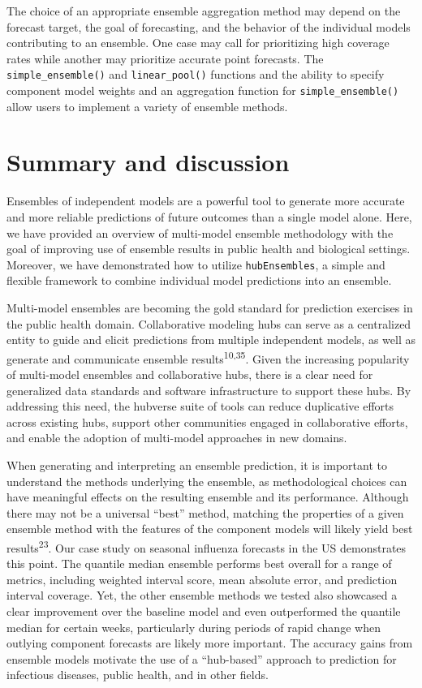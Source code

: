 \documentclass[
  letterpaper,
  DIV=11,
  numbers=noendperiod]{scrartcl}
\begin{document}
The choice of an appropriate ensemble aggregation method may depend on
the forecast target, the goal of forecasting, and the behavior of the
individual models contributing to an ensemble. One case may call for
prioritizing high coverage rates while another may prioritize accurate
point forecasts. The \texttt{simple\_ensemble()} and
\texttt{linear\_pool()} functions and the ability to specify component
model weights and an aggregation function for
\texttt{simple\_ensemble()} allow users to implement a variety of
ensemble methods.

\section{Summary and discussion}\label{sec-conclusions}

Ensembles of independent models are a powerful tool to generate more
accurate and more reliable predictions of future outcomes than a single
model alone. Here, we have provided an overview of multi-model ensemble
methodology with the goal of improving use of ensemble results in public
health and biological settings. Moreover, we have demonstrated how to
utilize \texttt{hubEnsembles}, a simple and flexible framework to
combine individual model predictions into an ensemble.

Multi-model ensembles are becoming the gold standard for prediction
exercises in the public health domain. Collaborative modeling hubs can
serve as a centralized entity to guide and elicit predictions from
multiple independent models, as well as generate and communicate
ensemble results\textsuperscript{10,35}. Given the increasing popularity
of multi-model ensembles and collaborative hubs, there is a clear need
for generalized data standards and software infrastructure to support
these hubs. By addressing this need, the hubverse suite of tools can
reduce duplicative efforts across existing hubs, support other
communities engaged in collaborative efforts, and enable the adoption of
multi-model approaches in new domains.

When generating and interpreting an ensemble prediction, it is important
to understand the methods underlying the ensemble, as methodological
choices can have meaningful effects on the resulting ensemble and its
performance. Although there may not be a universal ``best'' method,
matching the properties of a given ensemble method with the features of
the component models will likely yield best results\textsuperscript{23}.
Our case study on seasonal influenza forecasts in the US demonstrates
this point. The quantile median ensemble performs best overall for a
range of metrics, including weighted interval score, mean absolute
error, and prediction interval coverage. Yet, the other ensemble methods
we tested also showcased a clear improvement over the baseline model and
even outperformed the quantile median for certain weeks, particularly
during periods of rapid change when outlying component forecasts are
likely more important. The accuracy gains from ensemble models motivate
the use of a ``hub-based'' approach to prediction for infectious
diseases, public health, and in other fields.
\end{document}

